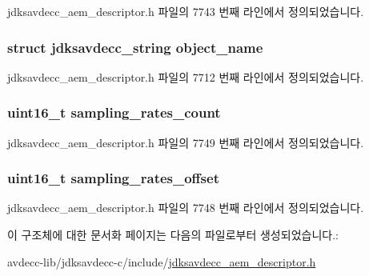 jdksavdecc\+\_\+aem\+\_\+descriptor.\+h 파일의 7743 번째 라인에서 정의되었습니다.

\subsubsection[{\texorpdfstring{object\+\_\+name}{object_name}}]{\setlength{\rightskip}{0pt plus 5cm}struct {\bf jdksavdecc\+\_\+string} object\+\_\+name}\hypertarget{structjdksavdecc__descriptor__audio__unit_a7d1f5945a13863b1762fc6db74fa8f80}{}\label{structjdksavdecc__descriptor__audio__unit_a7d1f5945a13863b1762fc6db74fa8f80}


jdksavdecc\+\_\+aem\+\_\+descriptor.\+h 파일의 7712 번째 라인에서 정의되었습니다.

\subsubsection[{\texorpdfstring{sampling\+\_\+rates\+\_\+count}{sampling_rates_count}}]{\setlength{\rightskip}{0pt plus 5cm}uint16\+\_\+t sampling\+\_\+rates\+\_\+count}\hypertarget{structjdksavdecc__descriptor__audio__unit_a9e41095f67119ce7ad3da11e7a7fa520}{}\label{structjdksavdecc__descriptor__audio__unit_a9e41095f67119ce7ad3da11e7a7fa520}


jdksavdecc\+\_\+aem\+\_\+descriptor.\+h 파일의 7749 번째 라인에서 정의되었습니다.

\subsubsection[{\texorpdfstring{sampling\+\_\+rates\+\_\+offset}{sampling_rates_offset}}]{\setlength{\rightskip}{0pt plus 5cm}uint16\+\_\+t sampling\+\_\+rates\+\_\+offset}\hypertarget{structjdksavdecc__descriptor__audio__unit_a9acd91129819909097f834e4592e8779}{}\label{structjdksavdecc__descriptor__audio__unit_a9acd91129819909097f834e4592e8779}


jdksavdecc\+\_\+aem\+\_\+descriptor.\+h 파일의 7748 번째 라인에서 정의되었습니다.



이 구조체에 대한 문서화 페이지는 다음의 파일로부터 생성되었습니다.\+:\begin{DoxyCompactItemize}
\item 
avdecc-\/lib/jdksavdecc-\/c/include/\hyperlink{jdksavdecc__aem__descriptor_8h}{jdksavdecc\+\_\+aem\+\_\+descriptor.\+h}\end{DoxyCompactItemize}
